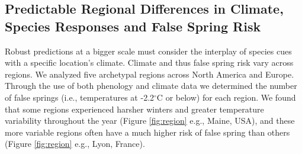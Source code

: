 \documentclass{article}\usepackage[]{graphicx}\usepackage[]{color}
\begin{document}

\subsection* {Predictable Regional Differences in Climate, Species Responses and False Spring Risk}
Robust predictions at a bigger scale must consider the interplay of species cues with a specific location's climate. Climate and thus false spring risk vary across regions. We analyzed five archetypal regions across North America and Europe. Through the use of both phenology \citep{USA-NPN2016, Soudani2012, Schaber2005,  White2009} and climate data \citep[from the NOAA Climate Data Online tool][]{NOAA} we determined the number of false springs (i.e., temperatures at -2.2$^{\circ}$C or below) for each region. We found that some regions experienced harsher winters and greater temperature variability throughout the year (Figure \ref{fig:region} e.g., Maine, USA), and these more variable regions often have a much higher risk of false spring than others (Figure \ref{fig:region} e.g., Lyon, France). 
\end{document}
